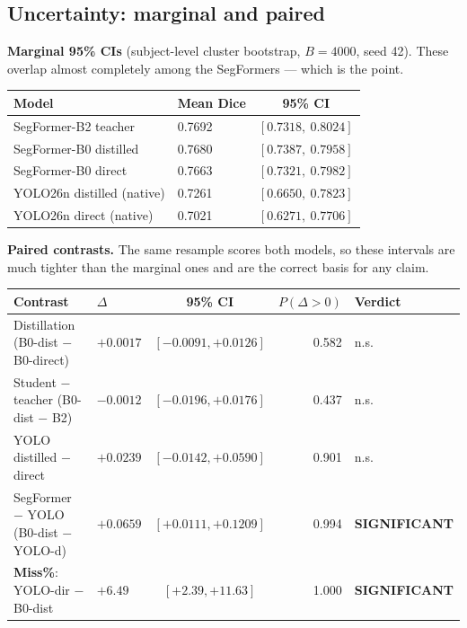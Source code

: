 \documentclass[11pt]{article}
\newcommand{\win}[1]{\textcolor{wingreen}{\textbf{#1}}}
\newcommand{\tabnote}[1]{\par\vspace{2pt}{\footnotesize\itshape #1}\par}
\begin{document}
\tabnote{"5th-pct subj.\ Dice" is the 5th percentile of the 28 subject-level mean Dice values ---
i.e.\ how bad the worst subjects are. The two zero-miss SegFormers separate here: B0-distilled has
the better worst-case subject, B2 the better \%\,Dice$<$0.20.}

\subsection{Uncertainty: marginal and paired}

\textbf{Marginal 95\% CIs} (subject-level cluster bootstrap, $B=4000$, seed 42). These overlap
almost completely among the SegFormers --- which is the point.

\begin{center}\small
\begin{tabular}{L M C}
\toprule
\textbf{Model} & \textbf{Mean Dice} & \textbf{95\% CI} \\
\midrule
SegFormer-B2 teacher       & 0.7692 & $[0.7318,\ 0.8024]$ \\
SegFormer-B0 distilled     & 0.7680 & $[0.7387,\ 0.7958]$ \\
SegFormer-B0 direct        & 0.7663 & $[0.7321,\ 0.7982]$ \\
YOLO26n distilled (native) & 0.7261 & $[0.6650,\ 0.7823]$ \\
YOLO26n direct (native)    & 0.7021 & $[0.6271,\ 0.7706]$ \\
\bottomrule
\end{tabular}
\end{center}

\textbf{Paired contrasts.} The same resample scores both models, so these intervals are much
tighter than the marginal ones and are the correct basis for any claim.

\begin{center}\small
\begin{tabular}{>{\raggedright\arraybackslash}p{4.6cm} M C n >{\raggedright\arraybackslash}p{2.85cm}}
\toprule
\textbf{Contrast} & $\Delta$ & \textbf{95\% CI} & $P(\Delta{>}0)$ & \textbf{Verdict} \\
\midrule
Distillation (B0-dist $-$ B0-direct)   & $+0.0017$ & $[-0.0091,+0.0126]$ & 0.582 & n.s. \\
Student $-$ teacher (B0-dist $-$ B2)   & $-0.0012$ & $[-0.0196,+0.0176]$ & 0.437 & n.s. \\
YOLO distilled $-$ direct              & $+0.0239$ & $[-0.0142,+0.0590]$ & 0.901 & n.s. \\
SegFormer $-$ YOLO (B0-dist $-$ YOLO-d)& $+0.0659$ & $[+0.0111,+0.1209]$ & 0.994 & \win{SIGNIFICANT} \\
\textbf{Miss\%}: YOLO-dir $-$ B0-dist & $+6.49$ & $[+2.39,+11.63]$ & 1.000 & \win{SIGNIFICANT} \\
\bottomrule
\end{tabular}
\end{center}
\end{document}
